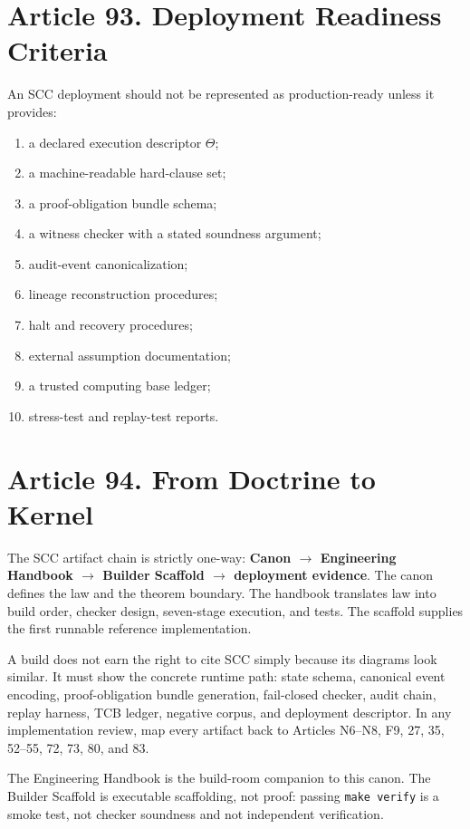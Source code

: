 \documentclass[10pt,oneside]{article}
\theoremstyle{definition}
\theoremstyle{remark}
\begin{document}
\section{Article 93. Deployment Readiness Criteria}
An SCC deployment should not be represented as production-ready unless it provides:
\begin{enumerate}
  \item a declared execution descriptor \(\Theta\);
  \item a machine-readable hard-clause set;
  \item a proof-obligation bundle schema;
  \item a witness checker with a stated soundness argument;
  \item audit-event canonicalization;
  \item lineage reconstruction procedures;
  \item halt and recovery procedures;
  \item external assumption documentation;
  \item a trusted computing base ledger;
  \item stress-test and replay-test reports.
\end{enumerate}


\section{Article 94. From Doctrine to Kernel}
The SCC artifact chain is strictly one-way: \textbf{Canon \(\rightarrow\) Engineering Handbook \(\rightarrow\) Builder Scaffold \(\rightarrow\) deployment evidence}. The canon defines the law and the theorem boundary. The handbook translates law into build order, checker design, seven-stage execution, and tests. The scaffold supplies the first runnable reference implementation.

A build does not earn the right to cite SCC simply because its diagrams look similar. It must show the concrete runtime path: state schema, canonical event encoding, proof-obligation bundle generation, fail-closed checker, audit chain, replay harness, TCB ledger, negative corpus, and deployment descriptor. In any implementation review, map every artifact back to Articles N6--N8, F9, 27, 35, 52--55, 72, 73, 80, and 83.

The Engineering Handbook is the build-room companion to this canon. The Builder Scaffold is executable scaffolding, not proof: passing \texttt{make verify} is a smoke test, not checker soundness and not independent verification.
\end{document}
